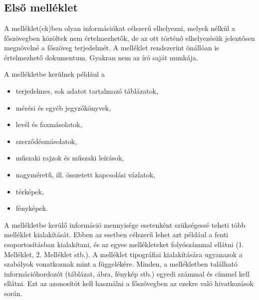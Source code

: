 \appendix
\chapter*{\melleklet}
\setcounter{chapter}{\annexletter} %
\setcounter{section}{0}

\section{Első melléklet}

A melléklet(ek)ben olyan információkat célszerű elhelyezni, melyek nélkül a főszövegben közöltek nem értelmezhetők, de az ott történő elhelyezésük jelentősen megnövelné a főszöveg terjedelmét. A melléklet rendszerint önállóan is értelmezhető dokumentum. Gyakran nem az író saját munkája. 

A mellékletbe kerülnek például a
\begin{itemize}
  \item terjedelmes, sok adatot tartalmazó táblázatok,
  \item mérési és egyéb jegyzőkönyvek,
  \item levél és faxmásolatok,
  \item szerződésmásolatok,
  \item műszaki rajzok és műszaki leírások,
  \item nagyméretű, ill. összetett kapcsolási vázlatok,
  \item térképek,
  \item fényképek.
\end{itemize}

A mellékletbe kerülő információ mennyisége esetenként szükségessé teheti több 
melléklet kialakítását. Ebben az esetben célszerű lehet azt például a fenti 
csoportosításban kialakítani, és az egyes mellékleteket folyószámmal ellátni 
(1. Melléklet, 2. Melléklet stb.).
A melléklet tipográfiai kialakítására ugyanazok a szabályok vonatkoznak mint a 
függelékére. 
Minden, a mellékletben található információhordozót (táblázat, ábra, 
fénykép stb.) egyedi számmal és címmel kell ellátni. Ezt az azonosítót kell 
használni a főszövegben az ezekre való hivatkozások során.


